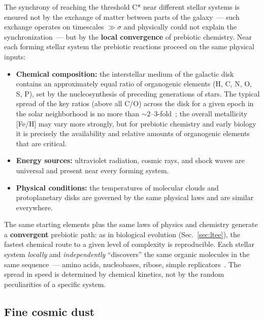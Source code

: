 \documentclass[11pt,a4paper]{article}
\begin{document}
The synchrony of reaching the threshold C* near different stellar systems is ensured not by the exchange of matter between parts of the galaxy~--- such exchange operates on timescales $\gg \sigma$ and physically could not explain the synchronization~--- but by the \textbf{local convergence} of prebiotic chemistry. Near each forming stellar system the prebiotic reactions proceed on the same physical inputs:

\begin{itemize}
   \item \textbf{Chemical composition:} the interstellar medium of the galactic disk contains an approximately equal ratio of organogenic elements (H, C, N, O, S, P), set by the nucleosynthesis of preceding generations of stars. The typical spread of the key ratios (above all C/O) across the disk for a given epoch in the solar neighborhood is no more than $\sim 2$--$3$-fold~\cite{Oberg2021,BrewerFischer2016}; the overall metallicity [Fe/H] may vary more strongly, but for prebiotic chemistry and early biology it is precisely the availability and relative amounts of organogenic elements that are critical.
   \item \textbf{Energy sources:} ultraviolet radiation, cosmic rays, and shock waves are universal and present near every forming system.
   \item \textbf{Physical conditions:} the temperatures of molecular clouds and protoplanetary disks are governed by the same physical laws and are similar everywhere.
\end{itemize}

The same starting elements plus the same laws of physics and chemistry generate a \textbf{convergent} prebiotic path: as in biological evolution (Sec.~\ref{sec:ltee}), the fastest chemical route to a given level of complexity is reproducible. Each stellar system \emph{locally} and \emph{independently} ``discovers'' the same organic molecules in the same sequence~--- amino acids, nucleobases, ribose, simple replicators~\cite{Furukawa2019,Callahan2011,Oberg2021}. The spread in speed is determined by chemical kinetics, not by the random peculiarities of a specific system.

\subsection{Fine cosmic dust}
\label{sec:idp_dust}
\end{document}
